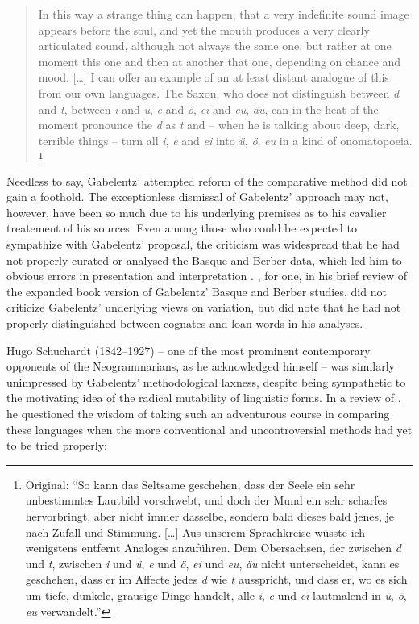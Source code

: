 \documentclass[output=paper]{langscibook}
\begin{document}
\begin{quotation}
In this way a strange thing can happen, that a very indefinite sound image appears before the soul, and yet the mouth produces a very clearly articulated sound, although not always the same one, but rather at one moment this one and then at another that one, depending on chance and mood. […] I can offer an example of an at least distant analogue of this from our own languages. The Saxon, who does not distinguish between \emph{d} and \emph{t}, between \emph{i} and \emph{ü}, \emph{e} and \emph{ö}, \emph{ei} and \emph{eu}, \emph{äu}, can in the heat of the moment pronounce the \emph{d} as \emph{t} and – when he is talking about deep, dark, terrible things – turn all \emph{i}, \emph{e} and \emph{ei} into \emph{ü}, \emph{ö}, \emph{eu} in a kind of onomatopoeia. \citep[606-607]{Gabelentz1893}\footnote{Original: ``So kann das Seltsame geschehen, dass der Seele ein sehr unbestimmtes Lautbild vorschwebt, und doch der Mund ein sehr scharfes hervorbringt, aber nicht immer dasselbe, sondern bald dieses bald jenes, je nach Zufall und Stimmung. […] Aus unserem Sprachkreise wüsste ich wenigstens entfernt Analoges anzuführen. Dem Obersachsen, der zwischen \emph{d} und \emph{t}, zwischen \emph{i} und \emph{ü}, \emph{e} und \emph{ö}, \emph{ei} und \emph{eu}, \emph{äu} nicht unterscheidet, kann es geschehen, dass er im Affecte jedes \emph{d} wie \emph{t} ausspricht, und dass er, wo es sich um tiefe, dunkele, grausige Dinge handelt, alle \emph{i}, \emph{e} und \emph{ei} lautmalend in \emph{ü}, \emph{ö}, \emph{eu} verwandelt.''}
\end{quotation}

Needless to say, Gabelentz' attempted reform of the comparative method did not gain a foothold. The exceptionless dismissal of Gabelentz' approach may not, however, have been so much due to his underlying premises as to his cavalier treatement of his sources. Even among those who could be expected to sympathize with Gabelentz' proposal, the criticism was widespread that he had not properly curated or analysed the Basque and Berber data, which led him to obvious errors in presentation and interpretation \citep[cf.][]{HurchPurgay2019}. \citet{Brinton1894}, for one, in his brief review of the \citeyear{Gabelentz1894bb} expanded book version of Gabelentz' Basque and Berber studies, did not criticize Gabelentz' underlying views on variation, but did note that he had not properly distinguished between cognates and loan words in his analyses.

Hugo Schuchardt (1842–1927) – one of the most prominent contemporary opponents of the Neogrammarians, as he acknowledged himself \citep[see, e.g., ][]{Schuchardt1928} – was similarly unimpressed by Gabelentz' methodological laxness, despite being sympathetic to the motivating idea of the radical mutability of linguistic forms. In a review of \citet{Gabelentz1894bb}, he questioned the wisdom of taking such an adventurous course in comparing these languages when the more conventional and uncontroversial methods had yet to be tried properly:
\end{document}
